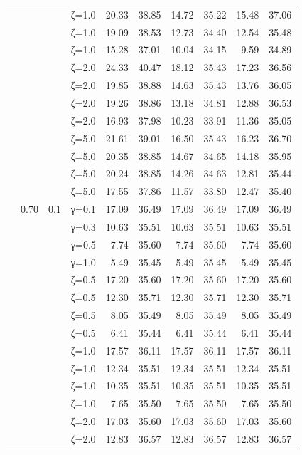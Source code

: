 \begin{table}[htbp]
\begin{tabular}{ll r l  rr  rr  rr}
  &  &  & ζ=1.0 & 20.33 & 38.85 & 14.72 & 35.22 & 15.48 & 37.06 \\
  &  &  & ζ=1.0 & 19.09 & 38.53 & 12.73 & 34.40 & 12.54 & 35.48 \\
  &  &  & ζ=1.0 & 15.28 & 37.01 & 10.04 & 34.15 & 9.59 & 34.89 \\
  &  &  & ζ=2.0 & 24.33 & 40.47 & 18.12 & 35.43 & 17.23 & 36.56 \\
  &  &  & ζ=2.0 & 19.85 & 38.88 & 14.63 & 35.43 & 13.76 & 36.05 \\
  &  &  & ζ=2.0 & 19.26 & 38.86 & 13.18 & 34.81 & 12.88 & 36.53 \\
  &  &  & ζ=2.0 & 16.93 & 37.98 & 10.23 & 33.91 & 11.36 & 35.05 \\
  &  &  & ζ=5.0 & 21.61 & 39.01 & 16.50 & 35.43 & 16.23 & 36.70 \\
  &  &  & ζ=5.0 & 20.35 & 38.85 & 14.67 & 34.65 & 14.18 & 35.95 \\
  &  &  & ζ=5.0 & 20.24 & 38.85 & 14.26 & 34.63 & 12.81 & 35.44 \\
  &  &  & ζ=5.0 & 17.55 & 37.86 & 11.57 & 33.80 & 12.47 & 35.40 \\
  & 0.70 & 0.1 & γ=0.1 & 17.09 & 36.49 & 17.09 & 36.49 & 17.09 & 36.49 \\
  &  &  & γ=0.3 & 10.63 & 35.51 & 10.63 & 35.51 & 10.63 & 35.51 \\
  &  &  & γ=0.5 & 7.74 & 35.60 & 7.74 & 35.60 & 7.74 & 35.60 \\
  &  &  & γ=1.0 & 5.49 & 35.45 & 5.49 & 35.45 & 5.49 & 35.45 \\
  &  &  & ζ=0.5 & 17.20 & 35.60 & 17.20 & 35.60 & 17.20 & 35.60 \\
  &  &  & ζ=0.5 & 12.30 & 35.71 & 12.30 & 35.71 & 12.30 & 35.71 \\
  &  &  & ζ=0.5 & 8.05 & 35.49 & 8.05 & 35.49 & 8.05 & 35.49 \\
  &  &  & ζ=0.5 & 6.41 & 35.44 & 6.41 & 35.44 & 6.41 & 35.44 \\
  &  &  & ζ=1.0 & 17.57 & 36.11 & 17.57 & 36.11 & 17.57 & 36.11 \\
  &  &  & ζ=1.0 & 12.34 & 35.51 & 12.34 & 35.51 & 12.34 & 35.51 \\
  &  &  & ζ=1.0 & 10.35 & 35.51 & 10.35 & 35.51 & 10.35 & 35.51 \\
  &  &  & ζ=1.0 & 7.65 & 35.50 & 7.65 & 35.50 & 7.65 & 35.50 \\
  &  &  & ζ=2.0 & 17.03 & 35.60 & 17.03 & 35.60 & 17.03 & 35.60 \\
  &  &  & ζ=2.0 & 12.83 & 36.57 & 12.83 & 36.57 & 12.83 & 36.57 \\

\end{tabular}
\end{table}
